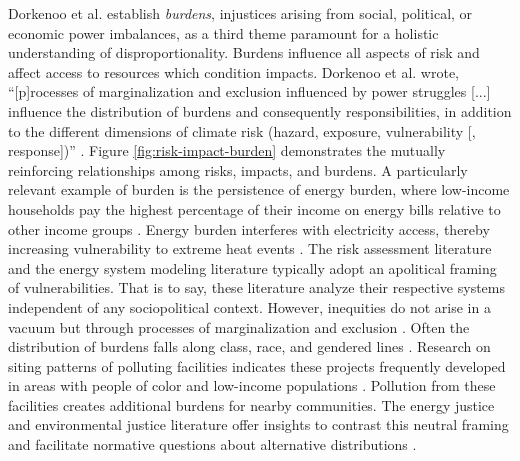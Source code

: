 Dorkenoo et al. \cite{dorkenoo_critical_2022} establish \textit{burdens},
injustices arising from social, political, or economic power imbalances, as a
third theme paramount for a holistic understanding of disproportionality.
Burdens influence all aspects of risk and affect access to resources which
condition impacts. Dorkenoo et al. wrote, ``[p]rocesses of marginalization and
exclusion influenced by power struggles [...] influence the distribution of
burdens and consequently responsibilities, in addition to the different
dimensions of climate risk (hazard, exposure, vulnerability [, response])''
\cite{dorkenoo_critical_2022}. Figure \ref{fig:risk-impact-burden} demonstrates
the mutually reinforcing relationships among risks, impacts, and burdens. A
particularly relevant example of burden is the persistence of energy burden,
where low-income households pay the highest percentage of their income on energy
bills relative to other income groups \cite{brown_high_2020,
cong_unveiling_2022}. Energy burden interferes with electricity access, thereby
increasing vulnerability to extreme heat events \cite{cong_unveiling_2022,
klinenberg_heat_2003}. The risk assessment literature and the energy system
modeling literature typically adopt an apolitical framing of vulnerabilities.
That is to say, these literature analyze their respective systems independent of
any sociopolitical context. However, inequities do not arise in a vacuum but
through processes of marginalization and exclusion
\cite{thomas_explaining_2019}. Often the distribution of burdens falls along
class, race, and gendered lines \cite{thomas_explaining_2019,mohai_which_2015}.
Research on siting patterns of polluting facilities indicates these projects
frequently developed in areas with people of color and low-income populations
\cite{mohai_which_2015}. Pollution from these facilities creates additional
burdens for nearby communities. The energy justice and environmental justice
literature offer insights to contrast this neutral framing and facilitate
normative questions about alternative distributions
\cite{dorkenoo_critical_2022, thomas_explaining_2019}.

